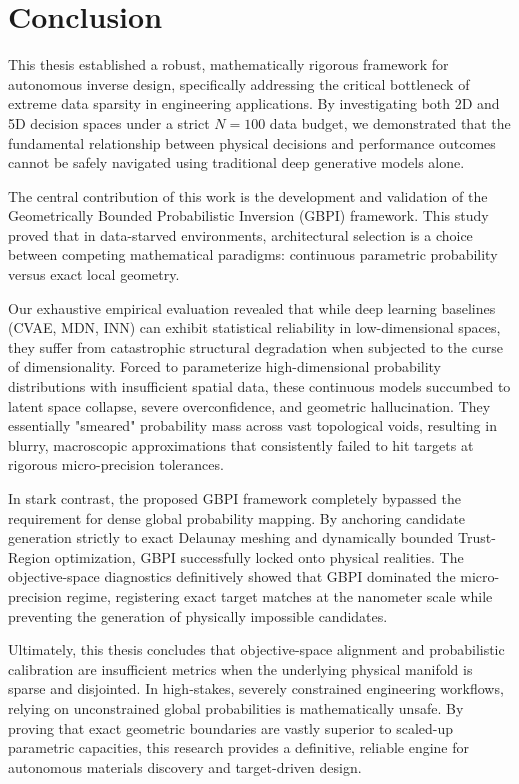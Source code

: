 \section{Conclusion}\label{sec:conclusion}

This thesis established a robust, mathematically rigorous framework for autonomous inverse design, specifically addressing the critical bottleneck of extreme data sparsity in engineering applications. By investigating both 2D and 5D decision spaces under a strict $N=100$ data budget, we demonstrated that the fundamental relationship between physical decisions and performance outcomes cannot be safely navigated using traditional deep generative models alone. 

The central contribution of this work is the development and validation of the Geometrically Bounded Probabilistic Inversion (GBPI) framework. This study proved that in data-starved environments, architectural selection is a choice between competing mathematical paradigms: continuous parametric probability versus exact local geometry. 

Our exhaustive empirical evaluation revealed that while deep learning baselines (CVAE, MDN, INN) can exhibit statistical reliability in low-dimensional spaces, they suffer from catastrophic structural degradation when subjected to the curse of dimensionality. Forced to parameterize high-dimensional probability distributions with insufficient spatial data, these continuous models succumbed to latent space collapse, severe overconfidence, and geometric hallucination. They essentially "smeared" probability mass across vast topological voids, resulting in blurry, macroscopic approximations that consistently failed to hit targets at rigorous micro-precision tolerances.

In stark contrast, the proposed GBPI framework completely bypassed the requirement for dense global probability mapping. By anchoring candidate generation strictly to exact Delaunay meshing and dynamically bounded Trust-Region optimization, GBPI successfully locked onto physical realities. The objective-space diagnostics definitively showed that GBPI dominated the micro-precision regime, registering exact target matches at the nanometer scale while preventing the generation of physically impossible candidates.

Ultimately, this thesis concludes that objective-space alignment and probabilistic calibration are insufficient metrics when the underlying physical manifold is sparse and disjointed. In high-stakes, severely constrained engineering workflows, relying on unconstrained global probabilities is mathematically unsafe. By proving that exact geometric boundaries are vastly superior to scaled-up parametric capacities, this research provides a definitive, reliable engine for autonomous materials discovery and target-driven design.